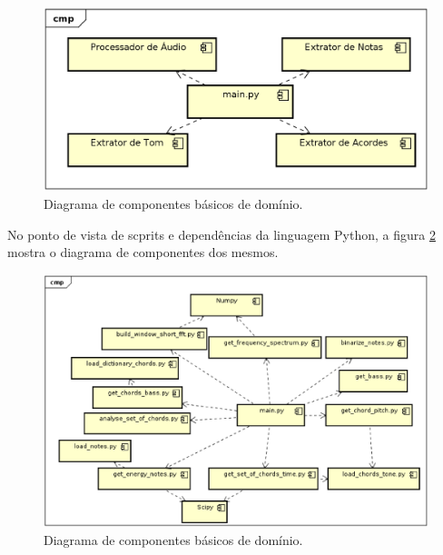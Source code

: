 \begin{figure}[h] 
  \centering
    \includegraphics[keepaspectratio=true, scale=0.4]{figuras/diagrama_componente_projeto_1}
    \caption{Diagrama de componentes básicos de domínio.}
    \label{fig:dominio}
\end{figure}

No ponto de vista de scprits e dependências da linguagem Python, a figura \ref{fig:diagrama_componente_projeto_2} mostra o diagrama de componentes dos mesmos.

\begin{figure}[h] 
  \centering
    \includegraphics[keepaspectratio=true, scale=0.6]{figuras/diagrama_componente_projeto_2}
    \caption{Diagrama de componentes básicos de domínio.}
    \label{fig:diagrama_componente_projeto_2}
\end{figure}

